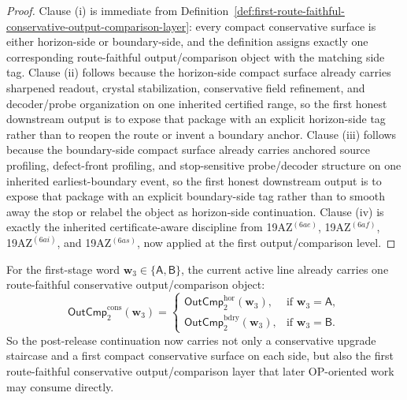 \begin{proof}
Clause (i) is immediate from Definition~\ref{def:first-route-faithful-conservative-output-comparison-layer}: every compact conservative surface is either horizon-side or boundary-side, and the definition assigns exactly one corresponding route-faithful output/comparison object with the matching side tag. Clause (ii) follows because the horizon-side compact surface already carries sharpened readout, crystal stabilization, conservative field refinement, and decoder/probe organization on one inherited certified range, so the first honest downstream output is to expose that package with an explicit horizon-side tag rather than to reopen the route or invent a boundary anchor. Clause (iii) follows because the boundary-side compact surface already carries anchored source profiling, defect-front profiling, and stop-sensitive probe/decoder structure on one inherited earliest-boundary event, so the first honest downstream output is to expose that package with an explicit boundary-side tag rather than to smooth away the stop or relabel the object as horizon-side continuation. Clause (iv) is exactly the inherited certificate-aware discipline from 19AZ$^{(6ae)}$, 19AZ$^{(6af)}$, 19AZ$^{(6ai)}$, and 19AZ$^{(6as)}$, now applied at the first output/comparison level.
\end{proof}

\begin{corollary}
\label{cor:the-present-post-v3290-line-already-carries-a-first-route-faithful-conservative-output-comparison-layer}
For the first-stage word \(\mathbf w_3\in\{\mathsf A,\mathsf B\}\), the current active line already carries one route-faithful conservative output/comparison object:
\[
  \mathsf{OutCmp}^{\mathrm{cons}}_{2}(\mathbf w_3)
  =
  \begin{cases}
    \mathsf{OutCmp}^{\mathrm{hor}}_{2}(\mathbf w_3), & \text{if }\mathbf w_3=\mathsf A,\\[2mm]
    \mathsf{OutCmp}^{\mathrm{bdry}}_{2}(\mathbf w_3), & \text{if }\mathbf w_3=\mathsf B.
  \end{cases}
\]
So the post-release continuation now carries not only a conservative upgrade staircase and a first compact conservative surface on each side, but also the first route-faithful conservative output/comparison layer that later OP-oriented work may consume directly.
\end{corollary}

